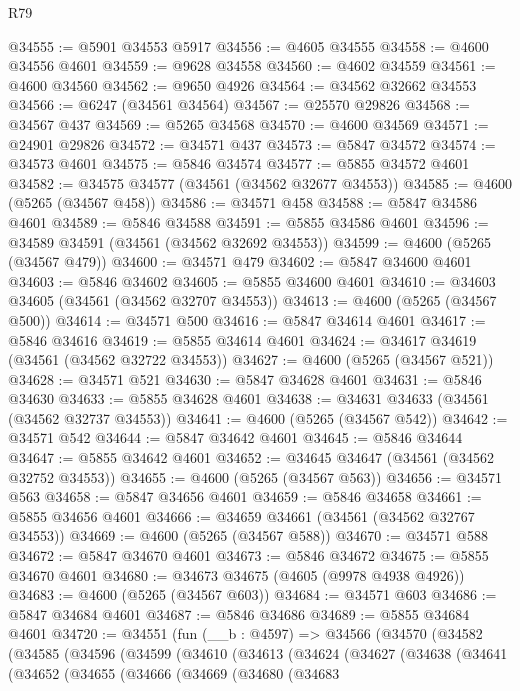 \begin{lexlean}{R79}
\begin{coremodule}
@34555 := @5901 @34553 @5917
@34556 := @4605 @34555
@34558 := @4600 @34556 @4601
@34559 := @9628 @34558
@34560 := @4602 @34559
@34561 := @4600 @34560
@34562 := @9650 @4926
@34564 := @34562 @32662 @34553
@34566 := @6247 (@34561 @34564)
@34567 := @25570 @29826
@34568 := @34567 @437
@34569 := @5265 @34568
@34570 := @4600 @34569
@34571 := @24901 @29826
@34572 := @34571 @437
@34573 := @5847 @34572
@34574 := @34573 @4601
@34575 := @5846 @34574
@34577 := @5855 @34572 @4601
@34582 := @34575 @34577 (@34561 (@34562 @32677 @34553))
@34585 := @4600 (@5265 (@34567 @458))
@34586 := @34571 @458
@34588 := @5847 @34586 @4601
@34589 := @5846 @34588
@34591 := @5855 @34586 @4601
@34596 := @34589 @34591 (@34561 (@34562 @32692 @34553))
@34599 := @4600 (@5265 (@34567 @479))
@34600 := @34571 @479
@34602 := @5847 @34600 @4601
@34603 := @5846 @34602
@34605 := @5855 @34600 @4601
@34610 := @34603 @34605 (@34561 (@34562 @32707 @34553))
@34613 := @4600 (@5265 (@34567 @500))
@34614 := @34571 @500
@34616 := @5847 @34614 @4601
@34617 := @5846 @34616
@34619 := @5855 @34614 @4601
@34624 := @34617 @34619 (@34561 (@34562 @32722 @34553))
@34627 := @4600 (@5265 (@34567 @521))
@34628 := @34571 @521
@34630 := @5847 @34628 @4601
@34631 := @5846 @34630
@34633 := @5855 @34628 @4601
@34638 := @34631 @34633 (@34561 (@34562 @32737 @34553))
@34641 := @4600 (@5265 (@34567 @542))
@34642 := @34571 @542
@34644 := @5847 @34642 @4601
@34645 := @5846 @34644
@34647 := @5855 @34642 @4601
@34652 := @34645 @34647 (@34561 (@34562 @32752 @34553))
@34655 := @4600 (@5265 (@34567 @563))
@34656 := @34571 @563
@34658 := @5847 @34656 @4601
@34659 := @5846 @34658
@34661 := @5855 @34656 @4601
@34666 := @34659 @34661 (@34561 (@34562 @32767 @34553))
@34669 := @4600 (@5265 (@34567 @588))
@34670 := @34571 @588
@34672 := @5847 @34670 @4601
@34673 := @5846 @34672
@34675 := @5855 @34670 @4601
@34680 := @34673 @34675 (@4605 (@9978 @4938 @4926))
@34683 := @4600 (@5265 (@34567 @603))
@34684 := @34571 @603
@34686 := @5847 @34684 @4601
@34687 := @5846 @34686
@34689 := @5855 @34684 @4601
@34720 := @34551
    (fun (__b : @4597) =>
    @34566
      (@34570
        (@34582
          (@34585
            (@34596
              (@34599
                (@34610
                  (@34613
                    (@34624
                      (@34627
                        (@34638
                          (@34641
                            (@34652
                              (@34655
                                (@34666
                                  (@34669
                                    (@34680
                                      (@34683

\end{coremodule}
\end{lexlean}
